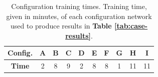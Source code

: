 \begin{table}[h!]
\begin{center}
\begin{tabular}{|c|c|c|c|c|c|c|c|c|c|}
\hline
\textbf{Config.} & A & B & C & D & E & F & G & H & I \\ \hline
\textbf{Time} & 2 & 8 & 9 & 2 & 8 & 8 & 1 & 11 & 11 \\ \hline
\end{tabular}
\end{center}
\caption[Configuration training times]{Configuration training times. Training time, given in minutes, of each configuration network used to produce results in \textbf{Table \ref{tab:case-results}}.}
\label{tab:train-times}
\end{table}


\cleardoublepage